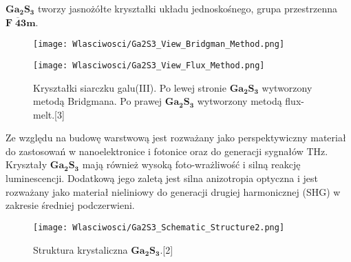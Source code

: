 $\mathbf{Ga_{2}S_{3}}$ tworzy jasnożółte kryształki układu jednoskośnego, grupa przestrzenna
$\mathbf{F\;\overline{4}3m}$.
\begin{figure}[H]
	\begin{center}
		\begin{minipage}[h]{0.3\linewidth}
			\texttt{[image: Wlasciwosci/Ga2S3\_View\_Bridgman\_Method.png]}
		\end{minipage}
		\begin{minipage}[h]{0.3\linewidth}
			\texttt{[image: Wlasciwosci/Ga2S3\_View\_Flux\_Method.png]}
		\end{minipage}
		\caption{Kryształki siarczku galu(III). Po lewej stronie $\mathbf{Ga_{2}S_{3}}$ wytworzony metodą Bridgmana. Po prawej $\mathbf{Ga_{2}S_{3}}$ wytworzony metodą flux-melt.[3]}
	\end{center}
\end{figure}
 Ze względu na budowę warstwową jest rozważany jako perspektywiczny materiał do zastosowań w nanoelektronice i fotonice oraz do generacji sygnałów THz.
 Kryształy $\mathbf{Ga_{2}S_{3}}$ mają również wysoką foto-wrażliwość i silną reakcję luminescencji. 
   Dodatkową jego zaletą jest silna anizotropia optyczna i jest rozważany jako materiał nieliniowy do generacji drugiej harmonicznej (SHG) w zakresie średniej podczerwieni.
\begin{figure}[H]
	\begin{center}
		\texttt{[image: Wlasciwosci/Ga2S3\_Schematic\_Structure2.png]}
		\caption{Struktura krystaliczna $\mathbf{Ga_{2}S_{3}}$.[2]}
	\end{center}
\end{figure}




